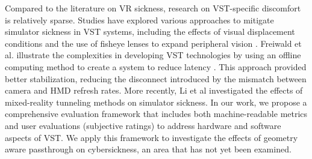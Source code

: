 Compared to the literature on VR sickness, research on VST-specific discomfort is relatively sparse. Studies have explored various approaches to mitigate simulator sickness in VST systems, including the effects of visual displacement conditions \cite{kim2014effects} and the use of fisheye lenses to expand peripheral vision \cite{orlosky2014fisheye}. Freiwald et al. illustrate the complexities in developing VST technologies by using an offline computing method to create a system to reduce latency \cite{freiwald2018camera}. This approach provided better stabilization, reducing the disconnect introduced by the mismatch between camera and HMD refresh rates. More recently, Li et al \cite{li2022mixed} investigated the effects of mixed-reality tunneling methods on simulator sickness. In our work, we propose a comprehensive evaluation framework that includes both machine-readable metrics and user evaluations (subjective ratings) to address hardware and software aspects of VST. We apply this framework to investigate the effects of geometry aware passthrough on cybersickness, an area that has not yet been examined.

